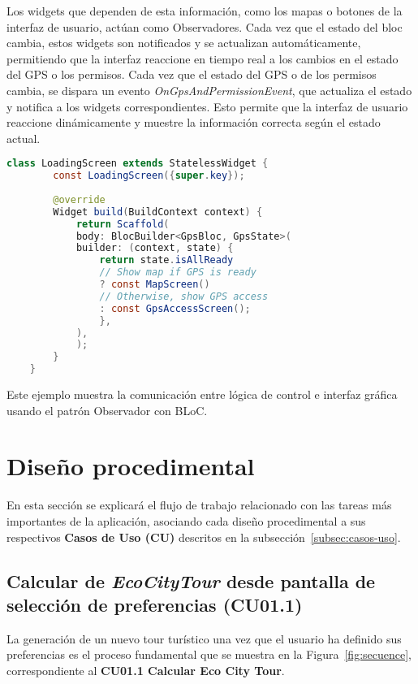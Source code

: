 Los widgets que dependen de esta información, como los mapas o botones de la interfaz de usuario, actúan como Observadores. Cada vez que el estado del \acrshort{bloc} cambia, estos widgets son notificados y se actualizan automáticamente, permitiendo que la interfaz reaccione en tiempo real a los cambios en el estado del GPS o los permisos.
Cada vez que el estado del GPS o de los permisos cambia, se dispara un evento \textit{OnGpsAndPermissionEvent}, que actualiza el estado y notifica a los widgets correspondientes. Esto permite que la interfaz de usuario reaccione dinámicamente y muestre la información correcta según el estado actual.

\begin{lstlisting}[language=Java, captionpos=b, frame=single, basicstyle=\ttfamily\footnotesize, caption={Carga en función del estado}, label={lst:loading-screen}]
	class LoadingScreen extends StatelessWidget {
		const LoadingScreen({super.key});
		
		@override
		Widget build(BuildContext context) {
			return Scaffold(
			body: BlocBuilder<GpsBloc, GpsState>(
			builder: (context, state) {
				return state.isAllReady
				// Show map if GPS is ready
				? const MapScreen()  
				// Otherwise, show GPS access
				: const GpsAccessScreen(); 
				},
			),
			);
		}
	}
\end{lstlisting}


	
Este ejemplo muestra la comunicación entre lógica de control e interfaz gráfica usando el patrón Observador con BLoC.


\section{Diseño procedimental}
En esta sección se explicará el flujo de trabajo relacionado con las tareas más importantes de la aplicación, asociando cada diseño procedimental a sus respectivos \textbf{Casos de Uso (CU)} descritos en la subsección~\ref{subsec:casos-uso}.

\subsection{Calcular de \textit{EcoCityTour} desde pantalla de selección de preferencias (CU01.1)}
La generación de un nuevo tour turístico una vez que el usuario ha definido sus preferencias es el proceso fundamental que se muestra en la Figura~\ref{fig:secuence}, correspondiente al \textbf{CU01.1 Calcular Eco City Tour}.

